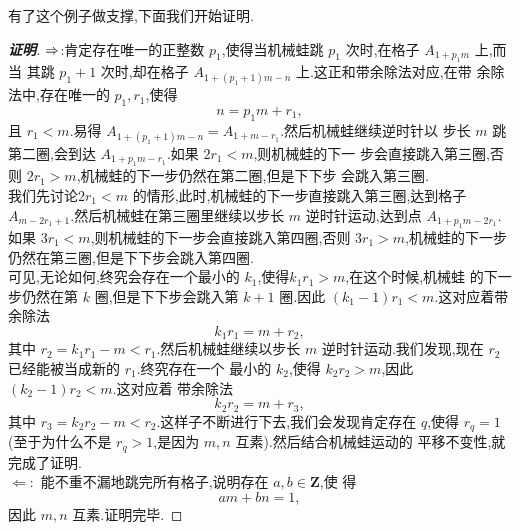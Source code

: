 \documentclass[a4paper]{article}
\begin{document}
有了这个例子做支撑,下面我们开始证明.
\begin{proof}[\textbf{证明}]
 $\Rightarrow$:肯定存在唯一的正整数 $p_{1}$,使得当机械蛙跳 $p_{1}$ 次时,在格子 $A_{1+p_{1}m}$ 上,而当
 其跳 $p_{1}+1$ 次时,却在格子 $A_{1+(p_{1}+1)m-n}$ 上.这正和带余除法对应,在带
 余除法中,存在唯一的 $p_1,r_1$,使得
$$
n=p_1m+r_1,
$$
且 $r_1<m$.易得 $A_{1+(p_1+1)m-n}=A_{1+m-r_1}$.然后机械蛙继续逆时针以
步长 $m$ 跳第二圈,会到达 $A_{1+p_1m-r_1}$.如果 $2r_1<m$,则机械蛙的下一
步会直接跳入第三圈,否则 $2r_1>m$,机械蛙的下一步仍然在第二圈,但是下下步
会跳入第三圈.\\

我们先讨论$2r_1<m$ 的情形,此时,机械蛙的下一步直接跳入第三圈,达到格子
$A_{m-2r_1+1}$.然后机械蛙在第三圈里继续以步长 $m$ 逆时针运动,达到点
$A_{1+p_1m-2r_1}$.如果 $3r_1<m$,则机械蛙的下一步会直接跳入第四圈,否则
$3r_1>m$,机械蛙的下一步仍然在第三圈,但是下下步会跳入第四圈.\\

可见,无论如何,终究会存在一个最小的 $k_{1}$,使得$k_{1}r_1>m$,在这个时候,机械蛙
的下一步仍然在第 $k$ 圈,但是下下步会跳入第 $k+1$ 圈.因此 $(k_1-1)r_1<m$.这对应着带余除法
$$
k_1r_1=m+r_2,
$$
其中 $r_2=k_1r_1-m<r_1$.然后机械蛙继续以步长 $m$ 逆时针运动.我们发现,现在 $r_2$ 已经能被当成新的 $r_1$.终究存在一个
最小的 $k_2$,使得 $k_2r_2>m$,因此 $(k_2-1)r_2<m$.这对应着
带余除法
$$
k_2r_2=m+r_3,
$$
其中 $r_3=k_2r_2-m<r_2$.这样子不断进行下去,我们会发现肯定存在 $q$,使得
$r_q=1$(至于为什么不是 $r_q>1$,是因为 $m,n$ 互素).然后结合机械蛙运动的
平移不变性,就完成了证明.\\

$\Leftarrow:$ 能不重不漏地跳完所有格子,说明存在 $a,b\in \mathbf{Z}$,使
得
$$
am+bn=1,
$$
因此 $m,n$ 互素.证明完毕.
\end{proof}
\end{document}
